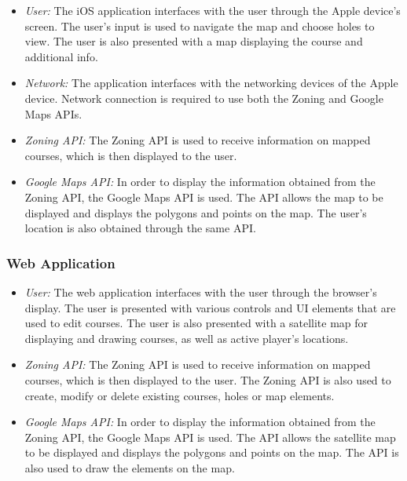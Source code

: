 \documentclass{article}
\begin{document}
    \begin{itemize}
        \item \textit{User:} The iOS application interfaces with the user
            through the Apple device's screen. The user's input is used to
            navigate the map and choose holes to view. The user is also
            presented with a map displaying the course and additional info.
        \item \textit{Network:} The application interfaces with the networking
            devices of the Apple device. Network connection is required to use
            both the Zoning and Google Maps APIs.
        \item \textit{Zoning API:} The Zoning API is used to receive
            information on mapped courses, which is then displayed to the user.
        \item \textit{Google Maps API:} In order to display the information
            obtained from the Zoning API, the Google Maps API is used. The API
            allows the map to be displayed and displays the polygons and points
            on the map. The user's location is also obtained through the same
            API.
    \end{itemize}

    \subsubsection{Web Application}

    \begin{itemize}
        \item \textit{User:} The web application interfaces with the user
            through the browser's display. The user is presented with various
            controls and UI elements that are used to edit courses. The user is
            also presented with a satellite map for displaying and drawing
            courses, as well as active player's locations.
        \item \textit{Zoning API:} The Zoning API is used to receive
            information on mapped courses, which is then displayed to the user.
            The Zoning API is also used to create, modify or delete existing
            courses, holes or map elements.
        \item \textit{Google Maps API:} In order to display the information
            obtained from the Zoning API, the Google Maps API is used. The API
            allows the satellite map to be displayed and displays the polygons
            and points on the map. The API is also used to draw the elements on
            the map. 
    \end{itemize}
\end{document}
